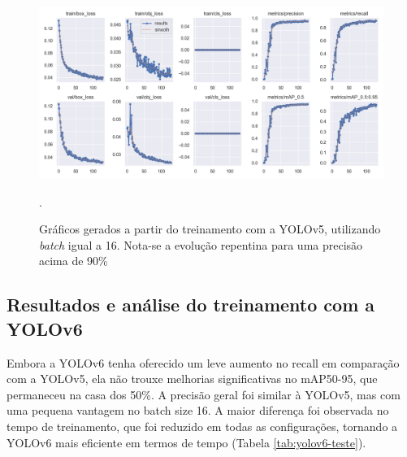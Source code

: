 \begin{figure}[!h]
    \centering
    \begin{minipage}{1\linewidth}
    \centering
    \captionsetup{justification=centering,margin=0.5cm,font=small}
    \includegraphics[width=1\linewidth]{img/cap6/results-yolov5-batch-16.png}
    \caption{Gráficos gerados a partir do treinamento com a YOLOv5, utilizando \textit{batch} igual a 16. Nota-se a evolução repentina para uma precisão acima de 90\%}.
    \label{fig:yolov5batch16}
    \end{minipage}
\end{figure}


\subsection{Resultados e análise do treinamento com a YOLOv6}

Embora a YOLOv6 tenha oferecido um leve aumento no recall em comparação com a YOLOv5, ela não trouxe melhorias significativas no mAP50-95, que permaneceu na casa dos 50\%. A precisão geral foi similar à YOLOv5, mas com uma pequena vantagem no batch size 16. A maior diferença foi observada no tempo de treinamento, que foi reduzido em todas as configurações, tornando a YOLOv6 mais eficiente em termos de tempo (Tabela \ref{tab:yolov6-teste}).

